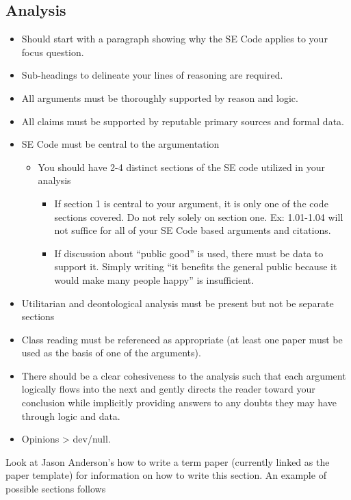 \documentclass[11pt]{article}
\begin{document}
\begin{multicols}{2}
\section{Analysis}
\begin{itemize}
   \item Should start with a paragraph showing why the SE Code applies to your focus
question.
   \item Sub-headings to delineate your lines of reasoning are required.
   \item All arguments must be thoroughly supported by reason and logic.
   \item All claims must be supported by reputable primary sources and formal data.
   \item SE Code must be central to the argumentation
   \begin{itemize}
      \item You should have 2-4 distinct sections of the SE code utilized in your analysis
      \begin{itemize}
         \item If section 1 is central to your argument, it is only one of the code sections covered. Do not rely solely on section one. Ex: 1.01-1.04 will not suffice for all of your SE Code based arguments and citations.
         \item If discussion about ``public good'' is used, there must be data to support it. Simply writing ``it benefits the general public because it would make many people happy'' is insufficient.
      \end{itemize}
   \end{itemize}
   \item Utilitarian and deontological analysis must be present but not be separate sections
   \item Class reading must be referenced as appropriate (at least one paper must be used as the basis of one of the arguments).
   \item There should be a clear cohesiveness to the analysis such that each argument logically flows into the next and gently directs the reader toward your conclusion while implicitly providing answers to any doubts they may have through logic and data.
   \item Opinions > dev/null. \cite{handout}
\end{itemize}

Look at Jason Anderson's how to write a term paper (currently linked as the paper template) for information on how to write this section.  An example of possible sections follows

\end{multicols}
\end{document}
